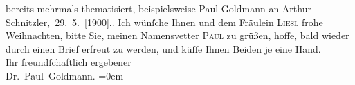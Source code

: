 \begin{ledgroupsized}[t]{13cm}
{{{                  bereits mehrmals thematisiert, beispielsweise Paul Goldmann an Arthur Schnitzler, 29. 5. [1900].}}}\label{K_L03537-4h}.\pend
           \pstart
           Ich wünſche Ihnen und dem Fräulein \textsc{Liesl} frohe Weihnachten, bitte Sie, meinen
               Namensvetter \textsc{Paul} zu grüßen, hoffe, bald wieder durch einen Brief erfreut zu werden, und küſſe
               Ihnen Beiden je eine Hand.
               {\\[\baselineskip]}Ihr freundſchaftlich ergebener {\\[\baselineskip]}\spacefill\mbox{Dr. Paul Goldmann.}\pend
           \leftskip=0em{}
         
         \endnumbering{}\end{ledgroupsized}  \newcommand{\dateiname}{L03537}\newcommand{\titel}{Paul Goldmann an Olga Gussmann, 20. 12. [1900]}\newcommand{\editorInnen}{Martin Anton Müller und Laura Untner}
      